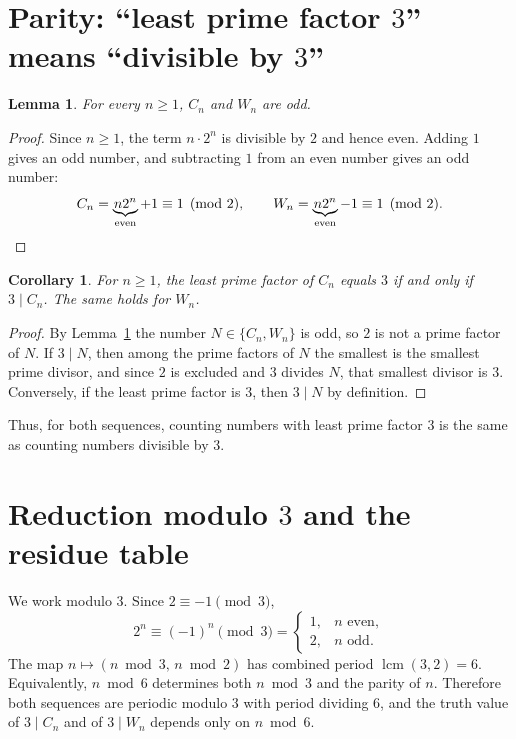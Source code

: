 \documentclass[11pt]{article}
\newtheorem{lemma}[theorem]{Lemma}
\newtheorem{corollary}[theorem]{Corollary}
\theoremstyle{definition}
\newcommand{\Cul}{C}
\newcommand{\Woo}{W}
\begin{document}
\section{Parity: ``least prime factor \(3\)'' means ``divisible by \(3\)''}

\begin{lemma}\label{lem:odd}
For every \(n\ge 1\), \(\Cul_n\) and \(\Woo_n\) are odd.
\end{lemma}

\begin{proof}
Since \(n\ge 1\), the term \(n\cdot 2^n\) is divisible by \(2\) and hence
even. Adding \(1\) gives an odd number, and subtracting \(1\) from an even
number gives an odd number:
\[
\Cul_n = \underbrace{n2^n}_{\text{even}} + 1 \equiv 1 \pmod 2,
\qquad
\Woo_n = \underbrace{n2^n}_{\text{even}} - 1 \equiv 1 \pmod 2. \qedhere
\]
\end{proof}

\begin{corollary}\label{cor:lpf}
For \(n\ge 1\), the least prime factor of \(\Cul_n\) equals \(3\) if and only
if \(3\mid \Cul_n\). The same holds for \(\Woo_n\).
\end{corollary}

\begin{proof}
By Lemma~\ref{lem:odd} the number \(N\in\{\Cul_n,\Woo_n\}\) is odd, so \(2\) is
not a prime factor of \(N\). If \(3\mid N\), then among the prime factors of
\(N\) the smallest is the smallest prime divisor, and since \(2\) is excluded
and \(3\) divides \(N\), that smallest divisor is \(3\). Conversely, if the
least prime factor is \(3\), then \(3\mid N\) by definition.
\end{proof}

Thus, for both sequences, counting numbers with least prime factor \(3\) is the
same as counting numbers divisible by \(3\).

\section{Reduction modulo \(3\) and the residue table}

We work modulo \(3\). Since \(2\equiv -1\pmod 3\),
\begin{equation}\label{eq:twopow}
2^n \equiv (-1)^n \pmod 3
=
\begin{cases}
1, & n \text{ even},\\
2, & n \text{ odd}.
\end{cases}
\end{equation}
The map \(n\mapsto (n \bmod 3,\, n \bmod 2)\) has combined period
\(\operatorname{lcm}(3,2)=6\). Equivalently, \(n\bmod 6\) determines both
\(n\bmod 3\) and the parity of \(n\). Therefore both sequences are periodic
modulo \(3\) with period dividing \(6\), and the truth value of
\(3\mid \Cul_n\) and of \(3\mid \Woo_n\) depends only on \(n\bmod 6\).
\end{document}
